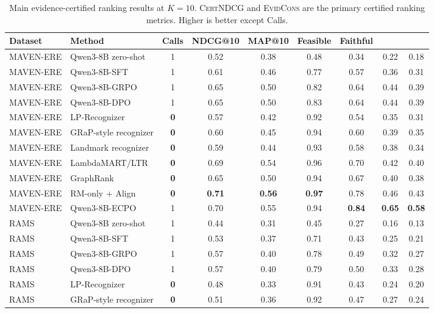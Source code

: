 \documentclass{article}
\newcommand{\ECPO}{\textsc{ECPO}}
\newcommand{\CertNDCG}{\textsc{CertNDCG}}
\newcommand{\EvidCons}{\textsc{EvidCons}}
\begin{document}
\begin{table}[t]
\centering
\caption{Main evidence-certified ranking results at $K=10$. \CertNDCG{} and \EvidCons{} are the primary certified ranking metrics. Higher is better except Calls.}
\label{tab:main_certified_results}
\small
\begin{adjustbox}{max width=\textwidth}
\begin{tabular}{l l c c c c c c c}
\toprule
Dataset & Method & Calls & NDCG@10 & MAP@10 & Feasible & Faithful & \EvidCons@10 & \CertNDCG@10 \\
\midrule
MAVEN-ERE & Qwen3-8B zero-shot & 1 & 0.52 & 0.38 & 0.48 & 0.34 & 0.22 & 0.18 \\
MAVEN-ERE & Qwen3-8B-SFT & 1 & 0.61 & 0.46 & 0.77 & 0.57 & 0.36 & 0.31 \\
MAVEN-ERE & Qwen3-8B-GRPO & 1 & 0.65 & 0.50 & 0.82 & 0.64 & 0.44 & 0.39 \\
MAVEN-ERE & Qwen3-8B-DPO & 1 & 0.65 & 0.50 & 0.83 & 0.64 & 0.44 & 0.39 \\
MAVEN-ERE & LP-Recognizer & \textbf{0} & 0.57 & 0.42 & 0.92 & 0.54 & 0.35 & 0.31 \\
MAVEN-ERE & GRaP-style recognizer & \textbf{0} & 0.60 & 0.45 & 0.94 & 0.60 & 0.39 & 0.35 \\
MAVEN-ERE & Landmark recognizer & \textbf{0} & 0.59 & 0.44 & 0.93 & 0.58 & 0.38 & 0.34 \\
MAVEN-ERE & LambdaMART/LTR & \textbf{0} & 0.69 & 0.54 & 0.96 & 0.70 & 0.42 & 0.40 \\
MAVEN-ERE & GraphRank & \textbf{0} & 0.65 & 0.50 & 0.94 & 0.67 & 0.40 & 0.38 \\
MAVEN-ERE & RM-only + Align & \textbf{0} & \textbf{0.71} & \textbf{0.56} & \textbf{0.97} & 0.78 & 0.46 & 0.43 \\
MAVEN-ERE & Qwen3-8B-\ECPO & 1 & 0.70 & 0.55 & 0.94 & \textbf{0.84} & \textbf{0.65} & \textbf{0.58} \\
\midrule
RAMS & Qwen3-8B zero-shot & 1 & 0.44 & 0.31 & 0.45 & 0.27 & 0.16 & 0.13 \\
RAMS & Qwen3-8B-SFT & 1 & 0.53 & 0.37 & 0.71 & 0.43 & 0.25 & 0.21 \\
RAMS & Qwen3-8B-GRPO & 1 & 0.57 & 0.40 & 0.78 & 0.49 & 0.32 & 0.27 \\
RAMS & Qwen3-8B-DPO & 1 & 0.57 & 0.40 & 0.79 & 0.50 & 0.33 & 0.28 \\
RAMS & LP-Recognizer & \textbf{0} & 0.48 & 0.33 & 0.91 & 0.43 & 0.24 & 0.20 \\
RAMS & GRaP-style recognizer & \textbf{0} & 0.51 & 0.36 & 0.92 & 0.47 & 0.27 & 0.24 \\

\end{tabular}
\end{adjustbox}
\end{table}
\end{document}
